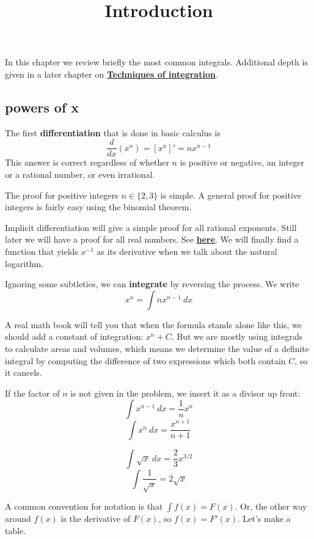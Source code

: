 \documentclass[11pt, oneside]{article}
\title{Introduction}
\date{}
\begin{document}
\maketitle
\Large


In this chapter we review briefly the most common integrals.  Additional depth is given in a later chapter on \hyperref[sec:Techniques_of_integration]{\textbf{Techniques of integration}}.

\subsection*{powers of x}
The first \textbf{differentiation} that is done in basic calculus is
\[ \frac{d}{dx} (x^n) = [x^n]' = n x^{n-1} \]
This answer is correct regardless of whether $n$ is positive or negative, an integer or a rational number, or even irrational. 

The proof for positive integers $n \in \{ 2, 3 \}$ is simple.  A general proof for positive integers is fairly easy using the binomial theorem.  

Implicit differentiation will give a simple proof for all rational exponents.  Still later we will have a proof for all real numbers.  See \hyperref[sec:Implicit_differentiation]{\textbf{here}}.  We will finally find a function that yields $x^{-1}$ as its derivative when we talk about the natural logarithm.
 
Ignoring some subtleties, we can \textbf{integrate} by reversing the process.  We write 
\[  x^n = \int n x^{n-1} \ dx \]

A real math book will tell you that when the formula stands alone like this, we should add a constant of integration:  $x^n + C$.  But we are mostly using integrals to calculate areas and volumes, which means we determine the value of a definite integral by computing the difference of two expressions which both contain $C$, so it cancels.  

If the factor of $n$ is not given in the problem, we insert it as a divisor up front:
\[  \int x^{n-1} \ dx = \frac{1}{n} x^n \]
\[  \int x^{n} \ dx = \frac{x^{n+1} }{n+1} \]
 
\[ \int \sqrt{x} \ dx = \frac{2}{3} x^{3/2} \]
\[ \int \frac{1}{\sqrt{x}} = 2 \sqrt{x} \]

A common convention for notation is that $\int f(x) = F(x)$.  Or, the other way around $f(x)$ is the derivative of $F(x)$, so $f(x) = F'(x)$.  Let's make a table.
\end{document}
